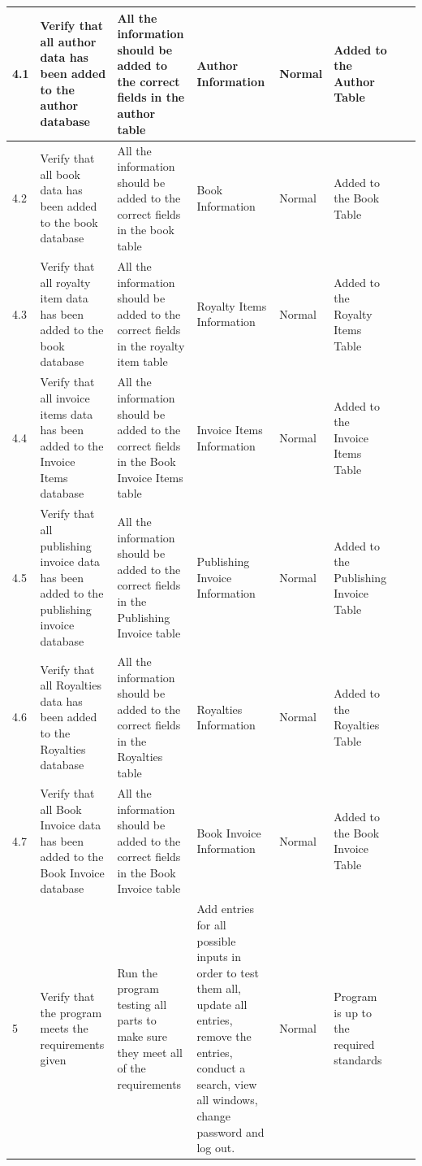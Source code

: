 \begin{landscape}
\begin{center}
\begin{longtable}{|p{1.5cm}|p{2cm}|p{2.5cm}|p{2.5cm}|p{2cm}|p{2cm}|p{2cm}|p{2cm}|}
        4.1 & Verify that all author data has been added to the author database & All the information should be added to the correct fields in the author table & Author Information & Normal & Added to the Author Table & & \\ \hline
        4.2 & Verify that all book data has been added to the book database & All the information should be added to the correct fields in the book table & Book Information & Normal & Added to the Book Table & & \\ \hline
        4.3 & Verify that all royalty item data has been added to the book database & All the information should be added to the correct fields in the royalty item table & Royalty Items Information & Normal & Added to the Royalty Items Table & & \\ \hline
        4.4 & Verify that all invoice items data has been added to the Invoice Items database & All the information should be added to the correct fields in the Book Invoice Items table & Invoice Items Information & Normal & Added to the Invoice Items Table & & \\ \hline
        4.5 & Verify that all publishing invoice data has been added to the publishing invoice database & All the information should be added to the correct fields in the Publishing Invoice table & Publishing Invoice Information & Normal & Added to the Publishing Invoice Table & & \\ \hline
        4.6 & Verify that all Royalties data has been added to the Royalties database & All the information should be added to the correct fields in the Royalties table & Royalties Information & Normal & Added to the Royalties Table & & \\ \hline
        4.7 & Verify that all Book Invoice data has been added to the Book Invoice database & All the information should be added to the correct fields in the Book Invoice table & Book Invoice Information & Normal & Added to the Book Invoice Table & & \\ \hline
        5 & Verify that the program meets the requirements given & Run the program testing all parts to make sure they meet all of the requirements & Add entries for all possible inputs in order to test them all, update all entries, remove the entries, conduct a search, view all windows, change password and log out. & Normal & Program is up to the required standards & & \\ \hline
    \end{longtable}
\end{center}





\end{landscape}
